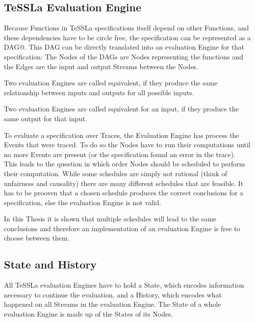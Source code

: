 \subsection{TeSSLa Evaluation Engine}
\label{sec:concepts:def:eval_engine}

Because Functions in TeSSLa specifications itself depend on other Functions, and these dependencies have to be circle free,
the specification can be represented as a DAG@.
This DAG can be directly translated into an evaluation Engine for that specification: The Nodes of the DAGs are Nodes representing the functions and the Edges are the input and output Streams between the Nodes.

\begin{definition}[name=Equivalence of evaluation Engines]\label{def:equivalence_eval_engine}
  Two evaluation Engines are called equivalent, if they produce the same relationship between inputs and outputs for all possible inputs.
\end{definition}

\begin{definition}[name=Equivalence of evaluation Engines for an input]\label{def:equivalence_eval_engine_specific}
  Two evaluation Engines are called equivalent for an input, if they produce the same output for that input.
\end{definition}

To evaluate a specification over Traces, the Evaluation Engine has process the Events that were traced.
To do so the Nodes have to run their computations until no more Events are present (or the specification found an error in the trace).
This leads to the question in which order Nodes should be scheduled to perform their computation.
While some schedules are simply not rational (think of unfairness and causality) there are many different schedules that are feasible.
It has to be prooven that a chosen schedule produces the correct conclusions for a specification, else the evaluation Engine is not valid.

In this Thesis it is shown that multiple schedules will lead to the same conclusions and therefore an implementation of an evaluation Engine is free to choose between them.

\subsection{State and History}
\label{sec:concepts:def:state}

All TeSSLa evaluation Engines have to hold a State, which encodes information necessary to continue the evaluation, and a History, which encodes what happened on all Streams in the evaluation Engine.
The State of a whole evaluation Engine is made up of the States of its Nodes.

